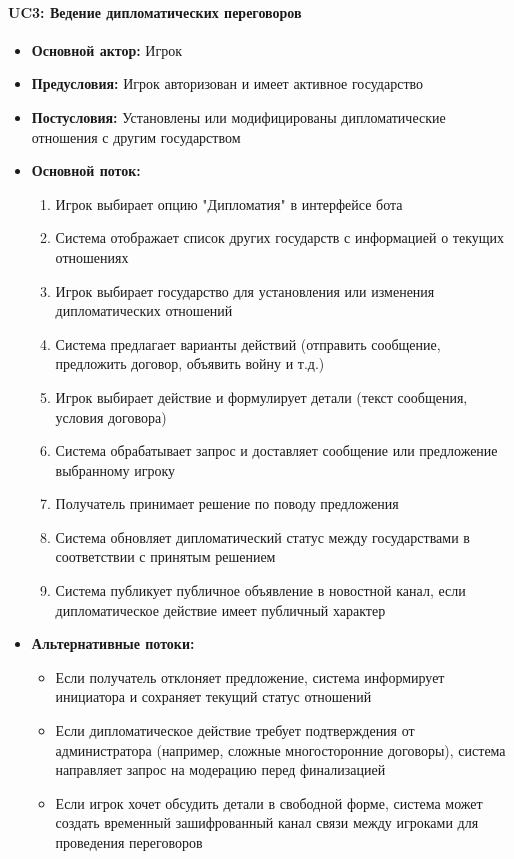 \paragraph{UC3: Ведение дипломатических переговоров}

\begin{itemize}
    \item \textbf{Основной актор:} Игрок
    \item \textbf{Предусловия:} Игрок авторизован и имеет активное государство
    \item \textbf{Постусловия:} Установлены или модифицированы дипломатические отношения с другим государством
    \item \textbf{Основной поток:}
    \begin{enumerate}
        \item Игрок выбирает опцию "{}Дипломатия"{} в интерфейсе бота
        \item Система отображает список других государств с информацией о текущих отношениях
        \item Игрок выбирает государство для установления или изменения дипломатических отношений
        \item Система предлагает варианты действий (отправить сообщение, предложить договор, объявить войну и т.д.)
        \item Игрок выбирает действие и формулирует детали (текст сообщения, условия договора)
        \item Система обрабатывает запрос и доставляет сообщение или предложение выбранному игроку
        \item Получатель принимает решение по поводу предложения
        \item Система обновляет дипломатический статус между государствами в соответствии с принятым решением
        \item Система публикует публичное объявление в новостной канал, если дипломатическое действие имеет публичный характер
    \end{enumerate}
    \item \textbf{Альтернативные потоки:}
    \begin{itemize}
        \item Если получатель отклоняет предложение, система информирует инициатора и сохраняет текущий статус отношений
        \item Если дипломатическое действие требует подтверждения от администратора (например, сложные многосторонние договоры), система направляет запрос на модерацию перед финализацией
        \item Если игрок хочет обсудить детали в свободной форме, система может создать временный зашифрованный канал связи между игроками для проведения переговоров
    \end{itemize}
\end{itemize}

